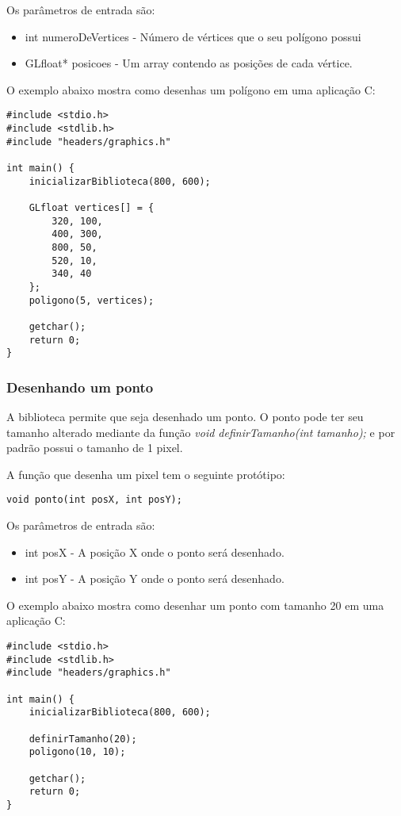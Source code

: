 \documentclass[12pt, %
openright,
oneside, %
a4paper,    %
brazil]{facom-ufu-abntex2}
\begin{document}
Os parâmetros de entrada são:

\begin{itemize}
    \item int numeroDeVertices - Número de vértices que o seu polígono possui
    \item GLfloat* posicoes - Um array contendo as posições de cada vértice.
\end{itemize}

O exemplo abaixo mostra como desenhas um polígono em uma aplicação C:

\begin{lstlisting}
#include <stdio.h>
#include <stdlib.h>
#include "headers/graphics.h"

int main() {
    inicializarBiblioteca(800, 600);

    GLfloat vertices[] = {
        320, 100,
        400, 300,
        800, 50,
        520, 10,
        340, 40
    };
    poligono(5, vertices);

    getchar();
    return 0;
}
\end{lstlisting}

\subsubsection{Desenhando um ponto}
A biblioteca permite que seja desenhado um ponto. O ponto pode ter seu tamanho alterado mediante da função \textit{void definirTamanho(int tamanho);} e por padrão possui o tamanho de 1 pixel.

A função que desenha um pixel tem o seguinte protótipo:

\begin{lstlisting}
void ponto(int posX, int posY);
\end{lstlisting}

Os parâmetros de entrada são:

\begin{itemize}
    \item int posX - A posição X onde o ponto será desenhado.
    \item int posY - A posição Y onde o ponto será desenhado.
\end{itemize}

O exemplo abaixo mostra como desenhar um ponto com tamanho 20 em uma aplicação C:

\begin{lstlisting}
#include <stdio.h>
#include <stdlib.h>
#include "headers/graphics.h"

int main() {
    inicializarBiblioteca(800, 600);

    definirTamanho(20);
    poligono(10, 10);

    getchar();
    return 0;
}
\end{lstlisting}
\end{document}

